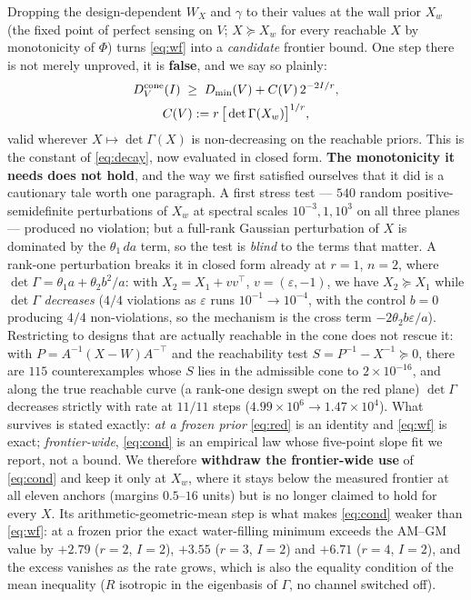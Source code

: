 \documentclass[journal]{IEEEtran}
\theoremstyle{remark}
\begin{document}
Dropping the design-dependent $W_X$ and $\gamma$ to their values at the wall
prior $X_w$ (the fixed point of perfect sensing on $V$; $X\succeq X_w$ for every
reachable $X$ by monotonicity of $\Phi$) turns \eqref{eq:wf} into a
\emph{candidate} frontier bound. One step there is not merely unproved, it is
\textbf{false}, and we say so plainly:
\begin{equation}
 \begin{gathered}
 D^{\rm cone}_V(I)\;\ge\;D_{\min}(V)+C(V)\,2^{-2I/r},\\
 C(V):=r\,\big[\det\Gamma(X_w)\big]^{1/r},
 \end{gathered}
\label{eq:cond}
\end{equation}
valid wherever $X\mapsto\det\Gamma(X)$ is non-decreasing on the reachable
priors. This is the constant of \eqref{eq:decay}, now evaluated in closed form.
\textbf{The monotonicity it needs does not hold}, and the way we first satisfied
ourselves that it did is a cautionary tale worth one paragraph. A first stress
test --- $540$ random positive-semidefinite perturbations of $X_w$ at spectral
scales $10^{-3},1,10^{3}$ on all three planes --- produced no violation; but a
full-rank Gaussian perturbation of $X$ is dominated by the $\theta_1\,da$ term,
so the test is \emph{blind} to the terms that matter. A rank-one perturbation
breaks it in closed form already at $r=1$, $n=2$, where
$\det\Gamma=\theta_1a+\theta_2b^2/a$: with $X_2=X_1+vv^{\top}$,
$v=(\varepsilon,-1)$, we have $X_2\succeq X_1$ while $\det\Gamma$ \emph{decreases}
($4/4$ violations as $\varepsilon$ runs $10^{-1}\to10^{-4}$, with the control
$b=0$ producing $4/4$ non-violations, so the mechanism is the cross term
$-2\theta_2b\varepsilon/a$). Restricting to designs that are actually reachable
in the cone does not rescue it: with $P=A^{-1}(X-W)A^{-\top}$ and the
reachability test $S=P^{-1}-X^{-1}\succeq0$, there are $115$ counterexamples
whose $S$ lies in the admissible cone to $2\times10^{-16}$, and along the true
reachable curve (a rank-one design swept on the red plane) $\det\Gamma$
decreases strictly with rate at $11/11$ steps ($4.99\times10^{6}\to1.47\times10^{4}$).
What survives is stated exactly: \emph{at a frozen prior} \eqref{eq:red} is an
identity and \eqref{eq:wf} is exact; \emph{frontier-wide}, \eqref{eq:cond} is
an empirical law whose five-point slope fit we report, not a bound. We therefore
\textbf{withdraw the frontier-wide use} of \eqref{eq:cond} and keep it only at
$X_w$, where it stays below the measured frontier at all eleven anchors
(margins $0.5$--$16$ units) but is no longer claimed to hold for every $X$.
Its arithmetic-geometric-mean step is what makes
\eqref{eq:cond} weaker than \eqref{eq:wf}: at a frozen prior the exact
water-filling minimum exceeds the $\mathrm{AM}$--$\mathrm{GM}$ value by
$+2.79$ ($r=2$, $I=2$), $+3.55$ ($r=3$, $I=2$) and $+6.71$ ($r=4$, $I=2$), and
the excess vanishes as the rate grows, which is also the equality condition of
the mean inequality ($R$ isotropic in the eigenbasis of $\Gamma$, no channel
switched off). 
\end{document}
